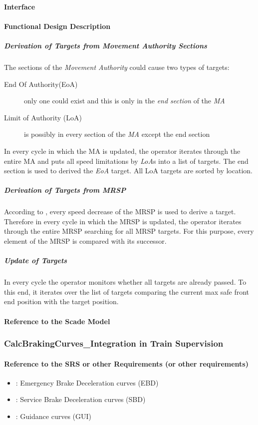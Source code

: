 \paragraph{Interface}

\paragraph{Functional Design Description}
\subparagraph{Derivation of Targets from Movement Authority Sections}
The sections of the \emph{Movement Authority} could cause two types of targets:
\begin{description}
\item[End Of Authority(EoA)] only one could exist and this is only in the \emph{end section} of the \emph{MA}
\item[Limit of Authority (LoA)] is possibly in every section of the \emph{MA} except the end section
\end{description}
In every cycle in which the MA is updated, the operator iterates through the entire MA and puts all speed limitations by \emph{LoA}s into a list of targets. The end section is used to derived the \emph{EoA} target. All LoA targets are sorted by location.

\subparagraph{Derivation of Targets from MRSP}
According to \cite[Chapt.~3.13.8.2]{subset-026}, every speed decrease of the MRSP is used to derive a target. Therefore in every cycle in which the MRSP is updated, the operator iterates through the entire MRSP searching for all MRSP targets. For this purpose, every element of the MRSP is compared with its successor.

\subparagraph{Update of Targets}
In every cycle the operator monitors whether all targets are already passed. To this end, it iterates over the list of targets comparing the current max safe front end position with the target position.

 


\paragraph{Reference to the Scade Model}


\subsubsection{CalcBrakingCurves\_Integration in Train Supervision}
\paragraph{Reference to the SRS or other Requirements (or other requirements)}
\begin{itemize}
	\item \cite[Chapt.~3.13.8.3]{subset-026}: Emergency Brake Deceleration curves (EBD)
	\item \cite[Chapt.~3.13.8.4]{subset-026}: Service Brake Deceleration curves (SBD)
	\item \cite[Chapt.~3.13.8.5]{subset-026}: Guidance curves (GUI)
\end{itemize}

